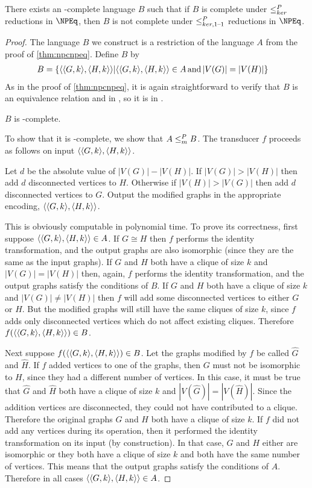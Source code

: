 \begin{theorem}
  There exists an \NP-complete language $B$ such that if $B$ is complete under $\leq^{P}_{ker}$ reductions in $\NPEq$, then $B$ is not complete under $\leq^{P}_{ker,1\text{--}1}$ reductions in $\NPEq$.
\end{theorem}
\begin{proof}
  The language $B$ we construct is a restriction of the language $A$ from the proof of \autoref{thm:npcnpeq}.
  Define $B$ by
  \begin{align*}
    B &= \{\langle\langle G,k\rangle,\langle H,k\rangle\rangle|\langle\langle G,k\rangle,\langle H,k\rangle\rangle\in A \,\text{and}\, |V(G)|=|V(H)|\}
  \end{align*}
  As in the proof of \autoref{thm:npcnpeq}, it is again straightforward to verify that $B$ is an equivalence relation and in \NP, so it is in \NPEq.

  \begin{claim}
    $B$ is \NP-complete.
  \end{claim}
  To show that it is \NP-complete, we show that $A\leq^{P}_{m} B$.
  The transducer $f$ proceeds as follows on input $\langle\langle G,k\rangle,\langle H,k\rangle\rangle$.

  Let $d$ be the absolute value of $|V(G)|-|V(H)|$.
  If $|V(G)|>|V(H)|$ then add $d$ disconnected vertices to $H$.
  Otherwise if $|V(H)|>|V(G)|$ then add $d$ disconnected vertices to $G$.
  Output the modified graphs in the appropriate encoding, $\langle\langle G,k\rangle,\langle H,k\rangle\rangle$.

  This is obviously computable in polynomial time.
  To prove its correctness, first suppose $\langle\langle G,k\rangle,\langle H,k\rangle\rangle\in A$.
  If $G\cong H$ then $f$ performs the identity transformation, and the output graphs are also isomorphic (since they are the same as the input graphs).
  If $G$ and $H$ both have a clique of size $k$ and $|V(G)|=|V(H)|$ then, again, $f$ performs the identity transformation, and the output graphs satisfy the conditions of $B$.
  If $G$ and $H$ both have a clique of size $k$ and $|V(G)|\neq|V(H)|$ then $f$ will add some disconnected vertices to either $G$ or $H$.
  But the modified graphs will still have the same cliques of size $k$, since $f$ adds only disconnected vertices which do not affect existing cliques.
  Therefore $f(\langle\langle G,k\rangle,\langle H,k\rangle\rangle)\in B$.

  Next suppose $f(\langle\langle G,k\rangle,\langle H,k\rangle\rangle)\in B$.
  Let the graphs modified by $f$ be called $\hat{G}$ and $\hat{H}$.
  If $f$ added vertices to one of the graphs, then $G$ must not be isomorphic to $H$, since they had a different number of vertices.
  In this case, it must be true that $\hat{G}$ and $\hat{H}$ both have a clique of size $k$ and $|V(\hat{G})|=|V(\hat{H})|$.
  Since the addition vertices are disconnected, they could not have contributed to a clique.
  Therefore the original graphs $G$ and $H$ both have a clique of size $k$.
  If $f$ did not add any vertices during its operation, then it performed the identity transformation on its input (by construction).
  In that case, $G$ and $H$ either are isomorphic or they both have a clique of size $k$ and both have the same number of vertices.
  This means that the output graphs satisfy the conditions of $A$.
  Therefore in all cases $\langle\langle G,k\rangle,\langle H,k\rangle\rangle\in A$.


\end{proof}
